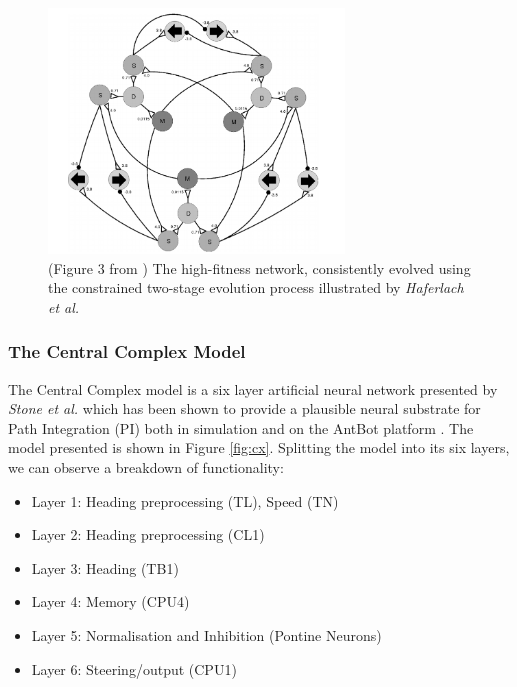 \documentclass[a4paper,11pt,twoside,openright]{article}
\begin{document}
\begin{figure}[h!]
  \centering
  \includegraphics[width=0.7\textwidth]{EvolvedNetwork}
  \caption{\label{fig:evolvednetwork} (Figure 3 from \cite{Haferlach2007})
    The high-fitness network, consistently evolved using the constrained
    two-stage evolution process illustrated by \textit{Haferlach et al.}
  }
\end{figure}

\subsubsection{The Central Complex Model}
The Central Complex model is a six layer artificial neural network
presented by \textit{Stone et al.} which has been shown to provide a
plausible neural substrate for Path Integration (PI) both in
simulation and on the AntBot platform \cite{Scimeca2017,
  Stone2017}. The model presented is shown in Figure
\ref{fig:cx}. Splitting the model into its six layers, we can observe
a breakdown of functionality:
\newline
\par

\begin{itemize}
\item{Layer 1: Heading preprocessing (TL), Speed (TN)}
\item{Layer 2: Heading preprocessing (CL1)}
\item{Layer 3: Heading (TB1)}
\item{Layer 4: Memory (CPU4)}
\item{Layer 5: Normalisation and Inhibition (Pontine Neurons)}
\item{Layer 6: Steering/output (CPU1)}
\end{itemize}
\end{document}
